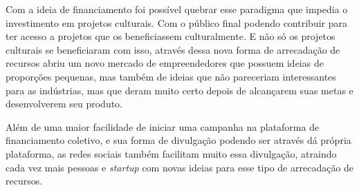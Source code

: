 \documentclass{classe_cn}                 %
\begin{document}
Com a ideia de financiamento foi possível quebrar esse paradigma que impedia o investimento em projetos culturais. Com o público final podendo contribuir para ter acesso a projetos que os beneficiassem culturalmente. E não só os projetos culturais se beneficiaram com isso, através dessa nova forma de arrecadação de recursos abriu um novo mercado de empreendedores que possuem ideias de proporções pequenas, mas também de ideias que não pareceriam interessantes para as indústrias, mas que deram muito certo depois de alcançarem suas metas e desenvolverem seu produto. 

Além de uma maior facilidade de iniciar uma campanha na plataforma de financiamento coletivo, e sua forma de divulgação podendo ser através dá própria plataforma, as redes sociais também facilitam muito essa divulgação, atraindo cada vez mais pessoas e \textit{startup} com novas ideias para esse tipo de arrecadação de recursos.


\vspace{1.0cm}
\end{document}
